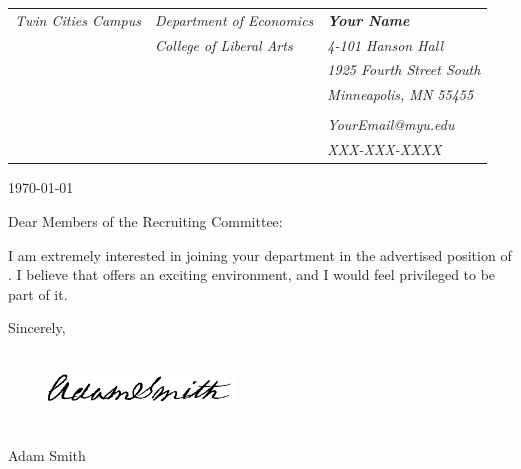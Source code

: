 \documentclass[11pt,english]{article}
\makeatletter
\providecommand{\tabularnewline}{\\}
\newcommand\skipblank{\@ifstar\@spskip\@nlskip}
\newcommand\@nlskip[1]{\ifthenelse{\DTLiseq{#1}{}}{\relax}{#1\\}}
\newcommand\@spskip[1]{\ifthenelse{\DTLiseq{#1}{}}{\relax}{#1\space}}
\makeatother
\begin{document}
    
    {%
    
    \thispagestyle{fancy}
    \begin{changemargin}{-0.0em}{-0.0em}
    \begin{tabular*}{17.7cm}{@{\extracolsep{\fill}}lll}

    \footnotesize \emph{Twin Cities Campus} & \footnotesize \emph{Department of Economics} &  \footnotesize \textbf{\emph{Your Name}}\tabularnewline [-.4em]
     & \footnotesize \emph{College of Liberal Arts} & \footnotesize \emph{4-101 Hanson Hall}\tabularnewline [-.4em] 
     &  & \footnotesize \emph{1925 Fourth Street South}\tabularnewline [-.4em]
     &  & \footnotesize \emph{Minneapolis, MN 55455}\tabularnewline [-.4em]
     &  & \tabularnewline [-.4em]
     &  & \footnotesize \emph{YourEmail@myu.edu}\tabularnewline [-.4em]
     &  & \footnotesize \emph{XXX-XXX-XXXX}
    \end{tabular*}
    \end{changemargin}    
    

\justify
\today

\justify
\skipblank{\institution}
\skipblank{\dept}
\vspace{0.5cm}
\justify   
Dear Members of the Recruiting Committee:

\justify
I am extremely interested in joining your department in the advertised position of \position. I believe that \institution   \thinspace offers an exciting environment, and I would feel privileged to be part of it. 

	\vspace{3cm}
	\hspace{13.6cm}
	 Sincerely,
		\vspace{-4mm}
	\begin{figure}[H]
	\hspace{13.5cm}
		\includegraphics[width=5cm,height=2cm]{Signature_File.png}
	\end{figure}
	\vspace{-9mm}
\hspace{13.6cm}  Adam Smith

\clearpage
}
\end{document}
